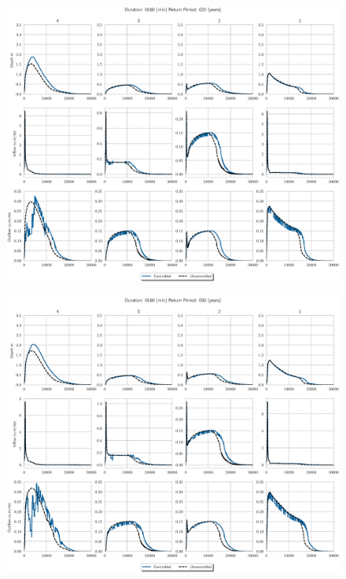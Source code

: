 \begin{figure}
    \centering
    \includegraphics[width=\linewidth]{./RL-SI-figures/77storms/0180025.eps}
\end{figure}
\begin{figure}
    \centering
    \includegraphics[width=\linewidth]{./RL-SI-figures/77storms/0180050.eps}
\end{figure}

